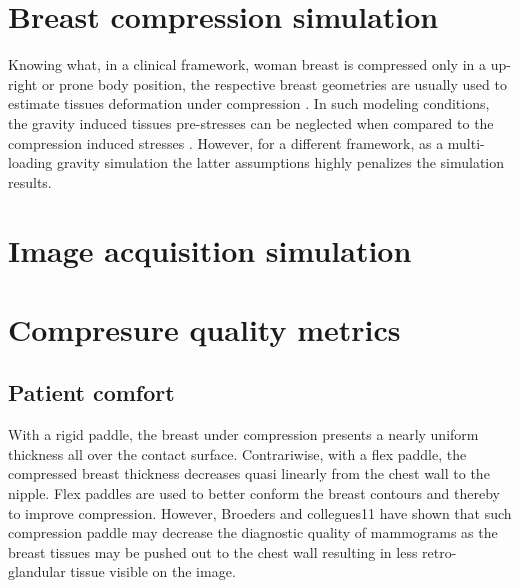 \section{Breast compression simulation}
Knowing what, in a clinical framework, woman breast is compressed only in a up-right or prone body position, the respective breast geometries are usually used to estimate tissues deformation under compression . In such modeling conditions, the gravity induced tissues pre-stresses can be neglected when compared to the compression induced stresses \citep{han_development_2012, ruiter_model_based_2006, sturgeon_finite_element_2016}. However, for a different framework, as a multi-loading gravity simulation the latter assumptions highly penalizes the simulation results.
\section{Image acquisition simulation }
\section{Compresure quality metrics}\label{section:compressionqualitymetrics}
\subsection{Patient comfort}
With a rigid paddle, the breast under compression presents a nearly uniform thickness all over the contact surface. Contrariwise, with a flex paddle, the compressed breast thickness decreases quasi linearly from the chest wall to the nipple. Flex paddles are used to better conform the breast contours and thereby to improve compression. However, Broeders and collegues11 have shown that such compression paddle may decrease the diagnostic quality of mammograms as the breast tissues may be pushed out to the chest wall resulting in less retro-glandular tissue visible on the image. 


